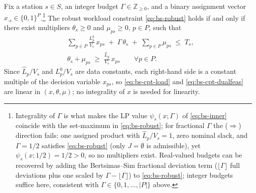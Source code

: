 \begin{proposition}
\label{prop:bs-counterpart}
Fix a station $s \in S$, an integer budget $\Gamma \in \mathbb Z_{\ge 0}$,
and a binary assignment vector
$x_{\cdot s} \in \{0,1\}^{P}$.\footnote{Integrality of $\Gamma$ is what makes
the LP value $\psi_s(x;\Gamma)$ of \eqref{eq:bs-inner} coincide with the
set-maximum in \eqref{eq:bs-robust}; for fractional $\Gamma$ the
($\Rightarrow$) direction fails: one assigned product with
$\hat L_p / V_s = 1$, zero nominal slack, and $\Gamma = 1/2$ satisfies
\eqref{eq:bs-robust} (only $J = \emptyset$ is admissible), yet
$\psi_s(x;1/2) = 1/2 > 0$, so no multipliers exist. Real-valued budgets can
be recovered by adding the Bertsimas--Sim fractional deviation term
($\lfloor \Gamma \rfloor$ full deviations plus one scaled by
$\Gamma - \lfloor \Gamma \rfloor$) to \eqref{eq:bs-robust}; integer budgets
suffice here, consistent with $\Gamma \in \{0, 1, \dots, |P|\}$ above.}
The robust workload constraint
\eqref{eq:bs-robust} holds if and only if there exist multipliers
$\theta_s \ge 0$ and $\mu_{ps} \ge 0$, $p \in P$, such that
\begin{align}
&\sum_{p \in P} \frac{L^0_p}{V_s}\, x_{ps}
\;+\; \Gamma\, \theta_s
\;+\; \sum_{p \in P} \mu_{ps}
\;\le\; T_s, \label{eq:bs-cpt-load}\\[2pt]
&\theta_s + \mu_{ps} \;\ge\; \frac{\hat L_p}{V_s}\, x_{ps}
\qquad \forall p \in P. \label{eq:bs-cpt-dualfeas}
\end{align}
Since $\hat L_p / V_s$ and $L^0_p / V_s$ are data constants, each right-hand
side is a constant multiple of the decision variable $x_{ps}$, so
\eqref{eq:bs-cpt-load} and \eqref{eq:bs-cpt-dualfeas} are linear in
$(x, \theta, \mu)$; no integrality of $x$ is needed for linearity.
\end{proposition}

